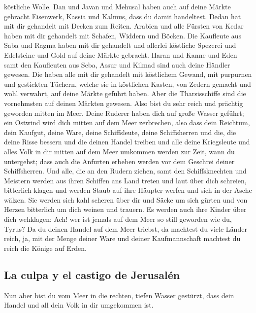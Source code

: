 köstliche Wolle.  Dan und Javan und Mehusal haben auch
auf deine Märkte gebracht Eisenwerk, Kassia und Kalmus, dass du damit
handeltest.  Dedan hat mit dir gehandelt mit Decken zum
Reiten.  Arabien und alle Fürsten von Kedar haben mit dir
gehandelt mit Schafen, Widdern und Böcken.  Die Kaufleute
aus Saba und Ragma haben mit dir gehandelt und allerlei köstliche
Spezerei und Edelsteine und Gold auf deine Märkte gebracht.
 Haran und Kanne und Eden samt den Kaufleuten aus Seba,
Assur und Kilmad sind auch deine Händler gewesen.  Die
haben alle mit dir gehandelt mit köstlichem Gewand, mit purpurnen und
gestickten Tüchern, welche sie in köstlichen Kasten, von Zedern gemacht
und wohl verwahrt, auf deine Märkte geführt haben.  Aber
die Tharsisschiffe sind die vornehmsten auf deinen Märkten gewesen. Also
bist du sehr reich und prächtig geworden mitten im Meer. 
Deine Ruderer haben dich auf große Wasser geführt; ein Ostwind wird dich
mitten auf dem Meer zerbrechen,  also dass dein Reichtum,
dein Kaufgut, deine Ware, deine Schiffsleute, deine Schiffsherren und
die, die deine Risse bessern und die deinen Handel treiben und alle
deine Kriegsleute und alles Volk in dir mitten auf dem Meer umkommen
werden zur Zeit, wann du untergehst;  dass auch die
Anfurten erbeben werden vor dem Geschrei deiner Schiffsherren.
 Und alle, die an den Rudern ziehen, samt den
Schiffsknechten und Meistern werden aus ihren Schiffen ans Land treten
 und laut über dich schreien, bitterlich klagen und
werden Staub auf ihre Häupter werfen und sich in der Asche wälzen.
 Sie werden sich kahl scheren über dir und Säcke um sich
gürten und von Herzen bitterlich um dich weinen und trauern.
 Es werden auch ihre Kinder über dich wehklagen: Ach! wer
ist jemals auf dem Meer so still geworden wie du, Tyrus? 
Da du deinen Handel auf dem Meer triebst, da machtest du viele Länder
reich, ja, mit der Menge deiner Ware und deiner Kaufmannschaft machtest
du reich die Könige auf Erden.

\hypertarget{la-culpa-y-el-castigo-de-jerusaluxe9n}{%
\subsection{La culpa y el castigo de
Jerusalén}\label{la-culpa-y-el-castigo-de-jerusaluxe9n}}

 Nun aber bist du vom Meer in die rechten, tiefen Wasser
gestürzt, dass dein Handel und all dein Volk in dir umgekommen ist.

